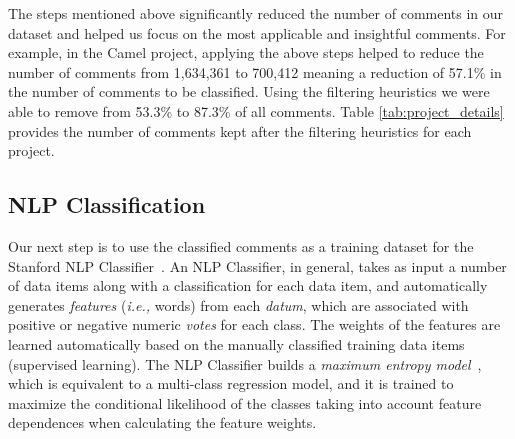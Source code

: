 The steps mentioned above significantly reduced the number of comments in our dataset and helped us focus on the most applicable and insightful comments.  For example, in the Camel project, applying the above steps helped to reduce the number of comments from 1,634,361 to 700,412 meaning a reduction of 57.1\% in the number of comments to be classified.  Using the filtering heuristics we were able to remove from 53.3\% to 87.3\% of all comments. Table \ref{tab:project_details} provides the number of comments kept after the filtering heuristics for each project.


\subsection{NLP Classification}
\label{sub:nlp_classification}

Our next step is to use the classified \SATD comments as a training dataset for the Stanford NLP Classifier~\cite{Manning2014ACL}.
An NLP Classifier, in general, takes as input a number of data items along with a classification for each data item, and automatically generates \textit{features} (\textit{i.e.,} words) from each \textit{datum}, which are associated with positive or negative numeric \textit{votes} for each class. The weights of the features are learned automatically based on the manually classified training data items (supervised learning). The NLP Classifier builds a \textit{maximum entropy model}~, which is equivalent to a multi-class regression model, and it is trained to maximize the conditional likelihood of the classes taking into account feature dependences when calculating the feature weights.

